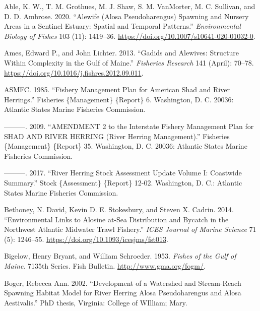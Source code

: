 \documentclass[
]{book}
\newlength{\cslhangindent}
\newlength{\cslentryspacingunit} %
\newenvironment{CSLReferences}[2] %
 {%
  \setlength{\parindent}{0pt}
  \ifodd #1
  \let\oldpar\par
  \def\par{\hangindent=\cslhangindent\oldpar}
  \fi
  \setlength{\parskip}{#2\cslentryspacingunit}
 }%
 {}
\begin{document}
\hypertarget{refs}{}
\begin{CSLReferences}{1}{0}
\leavevmode{}%
Able, K. W., T. M. Grothues, M. J. Shaw, S. M. VanMorter, M. C. Sullivan, and D. D. Ambrose. 2020. {``Alewife ({Alosa} Pseudoharengus) Spawning and Nursery Areas in a Sentinel Estuary: Spatial and Temporal Patterns.''} \emph{Environmental Biology of Fishes} 103 (11): 1419--36. \url{https://doi.org/10.1007/s10641-020-01032-0}.

\leavevmode{}%
Ames, Edward P., and John Lichter. 2013. {``Gadids and {Alewives}: {Structure} Within Complexity in the {Gulf} of {Maine}.''} \emph{Fisheries Research} 141 (April): 70--78. \url{https://doi.org/10.1016/j.fishres.2012.09.011}.

\leavevmode{}%
ASMFC. 1985. {``Fishery {Management} {Plan} for {American} {Shad} and {River} {Herrings}.''} Fisheries \{Management\} \{Report\} 6. Washington, D. C. 20036: Atlantic States Marine Fisheries Commission.

\leavevmode{}%
---------. 2009. {``{AMENDMENT} 2 to the {Interstate} {Fishery} {Management} {Plan} for {SHAD} {AND} {RIVER} {HERRING} ({River} {Herring} {Management}).''} Fisheries \{Management\} \{Report\} 35. Washington, D. C. 20036: Atlantic States Marine Fisheries Commission.

\leavevmode{}%
---------. 2017. {``River {Herring} {Stock} {Assessment} {Update} {Volume} {I}: {Coastwide} {Summary}.''} Stock \{Assessment\} \{Report\} 12-02. Washington, D. C.: Atlantic States Marine Fisheries Commission.

\leavevmode{}%
Bethoney, N. David, Kevin D. E. Stokesbury, and Steven X. Cadrin. 2014. {``Environmental Links to Alosine at-Sea Distribution and Bycatch in the {Northwest} {Atlantic} Midwater Trawl Fishery.''} \emph{ICES Journal of Marine Science} 71 (5): 1246--55. \url{https://doi.org/10.1093/icesjms/fst013}.

\leavevmode{}%
Bigelow, Henry Bryant, and William Schroeder. 1953. \emph{Fishes of the {Gulf} of {Maine}}. 7135th Series. Fish Bulletin. \url{http://www.gma.org/fogm/}.

\leavevmode{}%
Boger, Rebecca Ann. 2002. {``Development of a Watershed and Stream-Reach Spawning Habitat Model for River Herring {Alosa} Pseudoharengus and {Alosa} Aestivalis.''} PhD thesis, Virginia: College of WIlliam; Mary.


\end{CSLReferences}
\end{document}
